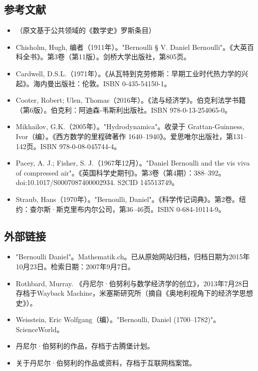 \subsection{参考文献} 
\begin{itemize}
\item （原文基于公共领域的《数学史》罗斯条目）  
\item Chisholm, Hugh, 编者（1911年）。"Bernoulli § V. Daniel Bernoulli"。《大英百科全书》。第3卷（第11版）。剑桥大学出版社，第805页。  
\item Cardwell, D.S.L.（1971年）。《从瓦特到克劳修斯：早期工业时代热力学的兴起》。海内曼出版社：伦敦。ISBN 0-435-54150-1。  
\item Cooter, Robert; Ulen, Thomas（2016年）。《法与经济学》。伯克利法学书籍（第6版）。伯克利：阿迪森-韦斯利出版社。ISBN 978-0-13-254065-0。  
\item Mikhailov, G.K.（2005年）。"Hydrodynamica"。收录于 Grattan-Guinness, Ivor（编）。《西方数学的里程碑著作 1640–1940》。爱思唯尔出版社，第131–142页。ISBN 978-0-08-045744-4。  
\item Pacey, A. J.; Fisher, S. J.（1967年12月）。"Daniel Bernoulli and the vis viva of compressed air"。《英国科学史期刊》。第3卷（第4期）：388–392。doi:10.1017/S0007087400002934. S2CID 145513749。  
\item Straub, Hans（1970年）。"Bernoulli, Daniel"。《科学传记词典》。第2卷。纽约：查尔斯·斯克里布内尔公司，第36–46页。ISBN 0-684-10114-9。
\end{itemize}
\subsection{外部链接}
\begin{itemize}
\item "Bernoulli Daniel"。Mathematik.ch。已从原始网站归档，归档日期为2015年10月23日。检索日期：2007年9月7日。
\item Rothbard, Murray. 《丹尼尔·伯努利与数学经济学的创立》，2013年7月28日存档于Wayback Machine，米塞斯研究所（摘自《奥地利视角下的经济学思想史》）。
\item Weisstein, Eric Wolfgang（编）。"Bernoulli, Daniel (1700–1782)"。ScienceWorld。
\item 丹尼尔·伯努利的作品，存档于古腾堡计划。
\item 关于丹尼尔·伯努利的作品或资料，存档于互联网档案馆。
\end{itemize}
